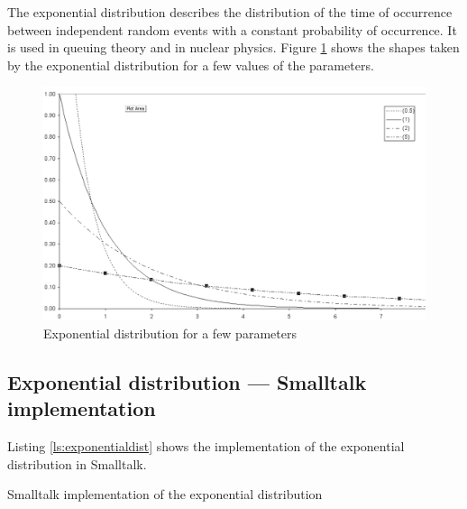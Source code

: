 \documentclass[twoside]{book}
\begin{document}
The exponential distribution describes the distribution of the
time of occurrence between independent random events with a
constant probability of occurrence. It is used in queuing theory
and in nuclear physics. Figure \ref{fig:expDistr} shows the shapes
taken by the exponential distribution for a few values of the
parameters.
\begin{figure}
\centering\includegraphics[width=12cm]{Figures/ExponentialDistribution}
\caption{Exponential distribution for a few
parameters}\label{fig:expDistr}
\end{figure}

\subsection{Exponential distribution --- Smalltalk  implementation}
Listing \ref{ls:exponentialdist} shows the implementation of the
exponential distribution in Smalltalk.

\begin{listing} Smalltalk implementation of the exponential distribution \label{ls:exponentialdist}

\end{listing}
\end{document}
